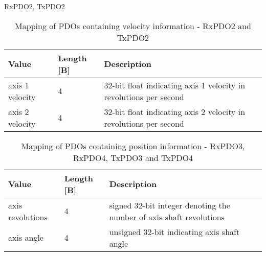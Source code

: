 RxPDO2, TxPDO2
\begin{table}[H]
    \centering
    \begin{tabular}{ |p{3cm}|p{2cm}|p{8cm}| }
        \hline
        Value & Length [B] & Description \\
        \hline
        \hline
        axis 1 velocity & 4 & 32-bit float indicating axis 1 velocity in revolutions per second \\
        \hline
        axis 2 velocity & 4 & 32-bit float indicating axis 2 velocity in revolutions per second \\
        \hline
    \end{tabular}
    \caption{Mapping of PDOs containing velocity information - RxPDO2 and TxPDO2}
    \label{tab:velocity_pdo}
\end{table}

\begin{table}[H]
    \centering
    \begin{tabular}{ |p{3cm}|p{2cm}|p{8cm}| }
        \hline
        Value & Length [B] & Description \\
        \hline
        \hline
        axis revolutions & 4 & signed 32-bit integer denoting the number of axis shaft revolutions \\
        \hline
        axis angle & 4 & unsigned 32-bit indicating axis shaft angle \\
        \hline
    \end{tabular}
    \caption{Mapping of PDOs containing position information - RxPDO3, RxPDO4, TxPDO3 and TxPDO4}
    \label{tab:position_pdo}
\end{table}

